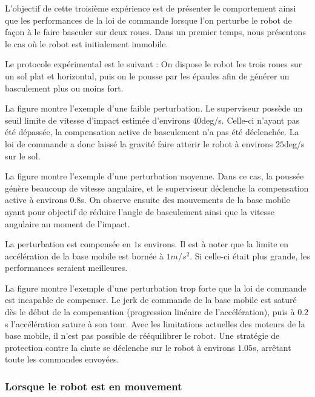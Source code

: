 	      L'objectif de cette troisième expérience  est de présenter le comportement ainsi que les performances de la loi de commande lorsque l'on perturbe le robot de façon à le faire basculer sur deux roues.
	      Dans un premier temps, nous présentons le cas où le robot est initialement immobile.
	      
	      Le protocole expérimental est le suivant :
	      On dispose le robot les trois roues sur un sol plat et horizontal, puis on le pousse par les épaules afin de générer un basculement plus ou moins fort.
	     
	     
	     La figure  montre l'exemple d'une faible perturbation.
	     Le superviseur possède un seuil limite de vitesse d'impact estimée d'environs $40$deg/s. Celle-ci n'ayant pas été dépassée, la compensation active de basculement n'a pas été déclenchée.
	     La loi de commande a donc laissé la gravité faire atterir le robot à environs $25$deg/s sur le sol.
	     
	     La figure  montre l'exemple d'une perturbation moyenne.
	     Dans ce cas, la poussée génère beaucoup de vitesse angulaire, et le superviseur déclenche la compensation active à environs $0.8$s.
	     On observe ensuite des mouvements de la base mobile ayant pour objectif de réduire l'angle de basculement ainsi que la vitesse angulaire au moment de l'impact.
	     
	     La perturbation est compensée en $1$s environs.
	     Il est à noter que la limite en accélération de la base mobile est bornée à $1m$/$s^2$.
	     Si celle-ci était plus grande, les performances seraient meilleures.
	     
	     La figure  montre l'exemple d'une perturbation trop forte que la loi de commande est incapable de compenser.
	     Le jerk de commande de la base mobile est saturé dès le début de la compensation (progression linéaire de l'accélération), puis à $0.2$s l'accélération sature à son tour.
	     Avec les limitations actuelles des moteurs de la base mobile, il n'est pas possible de rééquilibrer le robot.
	     Une stratégie de protection contre la chute se déclenche sur le robot à environs $1.05$s, arrêtant toute les commandes envoyées. 
	     
	     
	      
	  \subsubsection{Lorsque le robot est en mouvement}
	
